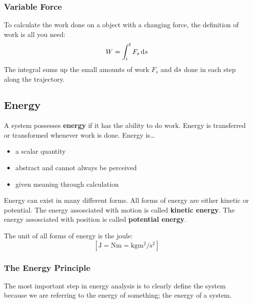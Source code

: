 \subsubsection{Variable Force}

To calculate the work done on a object with a changing force, the
definition of work is all you need:
\begin{equation}
    W = \int_\ini^\fin F_s \dif s
\end{equation}
The integral sums up the small amounts of work
$
    F_s
$ and
$
    \dif s
$ done in each step along the trajectory.

\subsection{Energy}

A system possesses \textbf{energy} if it has the ability to do work.
Energy is transferred or transformed whenever work is done.  Energy is\dots
\begin{itemize}
    \item
        a scalar quantity
    \item
        abstract and cannot always be perceived
    \item
        given meaning through calculation
\end{itemize}

Energy can exist in many different forms.  All forms of energy are
either kinetic or potential.  The energy assosciated with motion is
called \textbf{kinetic energy}.  The energy assosciated with position is
called \textbf{potential energy}.

The unit of all forms of energy is the joule:
\begin{equation}
    \left[\unit{\joule} = \unit{\newton\metre} = \unit{\kilo\gram\square\metre\per\square\second}\right]
\end{equation}

\subsubsection{The Energy Principle}

The most important step in energy analysis is to clearly define the
system because we are referring to the energy of something; the energy
of a system.

